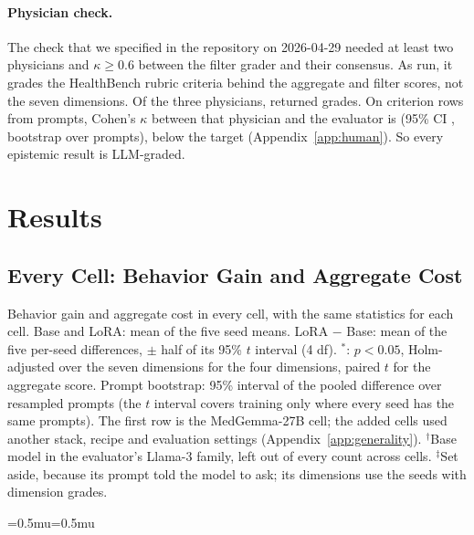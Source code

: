 \documentclass{article}
\begin{document}
\paragraph{Physician check.} The check that we specified in the repository on 2026-04-29 needed at
least two physicians and $\kappa \geq 0.6$ between the filter grader and their consensus. As run, it
grades the HealthBench rubric criteria behind the aggregate and filter scores, not the seven
dimensions. Of the three physicians, \statHBMedGemmaMayKappaRaters{} returned grades. On \statHBMedGemmaMayKappaEvalLlamaAllN{}
criterion rows from \statHBMedGemmaMayKappaEvalLlamaAllPrompts{} prompts, Cohen's $\kappa$ \citep{cohen1960coefficient}
between that physician and the evaluator is \statHBMedGemmaMayKappaEvalLlamaAll{} (95\% CI \statHBMedGemmaMayKappaEvalLlamaAllCI, bootstrap over
prompts), below the target (Appendix~\ref{app:human}). So every epistemic result is LLM-graded.

\section{Results}
\label{sec:results}

\subsection{Every Cell: Behavior Gain and Aggregate Cost}
\label{sec:cells}

\begin{table}[t]
\centering
\caption{Behavior gain and aggregate cost in every cell, with the same statistics for each cell.
Base and LoRA: mean of the five seed means. LoRA $-$ Base: mean of the five per-seed differences,
$\pm$ half of its 95\% $t$ interval (4 df). $^{*}$: $p < 0.05$, Holm-adjusted over the seven
dimensions for the four dimensions, paired $t$ for the aggregate score. Prompt bootstrap: 95\%
interval of the pooled difference over resampled prompts (the $t$ interval covers training only
where every seed has the same prompts). The first row is the
MedGemma-27B cell; the added cells used another stack, recipe and evaluation settings
(Appendix~\ref{app:generality}). $^{\dagger}$Base model in the evaluator's Llama-3 family, left out of every count across
cells. $^{\ddagger}$Set aside, because its prompt told the model to ask; its dimensions use the
\statMedQAPreMistralJulSeedsGraded{} seeds with dimension grades.}
\label{tab:cells}
\scriptsize
\setlength{\tabcolsep}{1.5pt}
\medmuskip=0.5mu\thinmuskip=0.5mu
\resizebox{\linewidth}{!}{}
\end{table}
\end{document}
